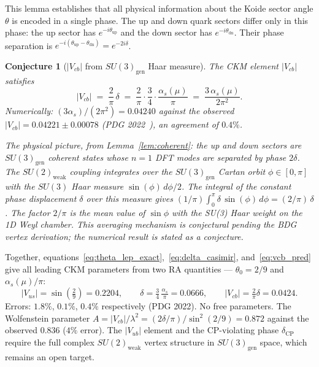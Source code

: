 \documentclass[11pt,a4paper]{article}
\newtheorem{conjecture}[theorem]{Conjecture}
\begin{document}
This lemma establishes that all physical information about the Koide
sector angle $\theta$ is encoded in a single phase. The up and down
quark sectors differ only in this phase: the up sector has
$e^{-i\theta_{\mathrm{up}}}$ and the down sector has
$e^{-i\theta_{\mathrm{dn}}}$. Their phase separation is
$e^{-i(\theta_{\mathrm{up}}-\theta_{\mathrm{dn}})} = e^{-2i\delta}$.

\begin{conjecture}[$|V_{cb}|$ from $SU(3)_{\mathrm{gen}}$ Haar measure]
\label{conj:vcb}
The CKM element $|V_{cb}|$ satisfies
\begin{equation}
  |V_{cb}| \;=\; \frac{2}{\pi}\,\delta
  \;=\; \frac{2}{\pi}\cdot\frac{3}{4}\cdot\frac{\alpha_s(\mu)}{\pi}
  \;=\; \frac{3\,\alpha_s(\mu)}{2\pi^2}.
  \label{eq:vcb_pred}
\end{equation}
Numerically: $(3\alpha_s)/(2\pi^2) = 0.04240$ against the observed
$|V_{cb}| = 0.04221 \pm 0.00078$ (PDG 2022~\citep{PDG2022}), an
agreement of $0.4\%$.

The physical picture, from Lemma~\ref{lem:coherent}: the up and
down sectors are $SU(3)_{\mathrm{gen}}$ coherent states whose $n=1$
DFT modes are separated by phase $2\delta$. The $SU(2)_{\mathrm{weak}}$
coupling integrates over the $SU(3)_{\mathrm{gen}}$ Cartan orbit
$\phi \in [0,\pi]$ with the $SU(3)$ Haar measure $\sin(\phi)\,d\phi/2$.
The integral of the constant phase displacement $\delta$ over this measure
gives $(1/\pi)\int_0^\pi \delta\,\sin(\phi)\,d\phi = (2/\pi)\,\delta$.
The factor $2/\pi$ is the mean value of $\sin\phi$ with the SU(3)
Haar weight on the 1D Weyl chamber. This averaging mechanism is
conjectural pending the BDG vertex derivation; the numerical result
is stated as a conjecture.
\end{conjecture}

Together, equations~\eqref{eq:theta_lep_exact},~\eqref{eq:delta_casimir},
and~\eqref{eq:vcb_pred} give all leading CKM parameters from two
RA quantities --- $\theta_0 = 2/9$ and $\alpha_s(\mu)/\pi$:
\begin{equation}
  |V_{us}| = \sin\!\left(\tfrac{2}{9}\right) = 0.2204,
  \qquad
  \delta = \tfrac{3}{4}\,\tfrac{\alpha_s}{\pi} = 0.0666,
  \qquad
  |V_{cb}| = \tfrac{2}{\pi}\delta = 0.0424.
  \label{eq:ckm_summary}
\end{equation}
Errors: $1.8\%$, $0.1\%$, $0.4\%$ respectively (PDG 2022).
No free parameters. The Wolfenstein parameter
$A = |V_{cb}|/\lambda^2 = (2\delta/\pi)/\sin^2(2/9) = 0.872$
against the observed $0.836$ ($4\%$ error).
The $|V_{ub}|$ element and the CP-violating phase $\delta_{\mathrm{CP}}$
require the full complex $SU(2)_{\mathrm{weak}}$
vertex structure in $SU(3)_{\mathrm{gen}}$ space, which remains an open target.
\end{document}
